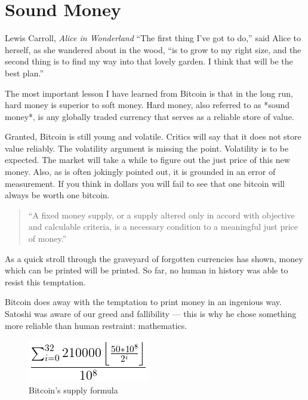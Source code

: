 \chapter{ Sound Money}
\label{les:14}

\begin{chapquote}{Lewis Carroll, \textit{Alice in Wonderland}}
``The first thing I've got to do,'' said Alice to herself, as she wandered about
in the wood, ``is to grow to my right size, and the second thing is to find my
way into that lovely garden. I think that will be the best plan.''
\end{chapquote}

The most important lesson I have learned from Bitcoin is that in the
long run, hard money is superior to soft money. Hard money, also
referred to as *sound money*, is any globally traded currency that
serves as a reliable store of value.

Granted, Bitcoin is still young and volatile. Critics will say that it
does not store value reliably. The volatility argument is missing the
point. Volatility is to be expected. The market will take a while to
figure out the just price of this new money. Also, as is often jokingly
pointed out, it is grounded in an error of measurement. If you think in
dollars you will fail to see that one bitcoin will always be worth one
bitcoin.

\begin{quotation}
``A fixed money supply, or a supply altered only in accord with
objective and calculable criteria, is a necessary condition to a
meaningful just price of money.''
\end{quotation}

As a quick stroll through the graveyard of forgotten currencies has
shown, money which can be printed will be printed. So far, no human in
history was able to resist this temptation.

Bitcoin does away with the temptation to print money in an ingenious
way. Satoshi was aware of our greed and fallibility --- this is why he
chose something more reliable than human restraint: mathematics.

\begin{figure}
  \centering
  \includegraphics{assets/images/supply-formula-white.png}
  \caption{Bitcoin's supply formula}
  \label{fig:supply-formula-white}
\end{figure}

